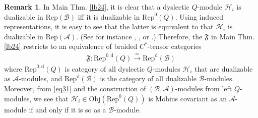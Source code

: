 \documentclass[11pt,b5paper,notitlepage]{article}
\theoremstyle{definition}
\newtheorem{rem}[df]{Remark}
\theoremstyle{plain}
\newcommand{\fk}{\mathfrak}
\newcommand{\mc}{\mathcal}
\newcommand{\Rep}{\mathrm{Rep}}
\newcommand{\RepA}{\mathrm{Rep}(\mathcal A)}
\newcommand{\Obj}{\mathrm{Obj}}
\numberwithin{equation}{section}
\begin{document}
\begin{rem}
In Main Thm. \ref{lb24}, it is clear that a dyslectic $Q$-module $\mc H_i$ is dualizable in $\Rep(\mc B)$ iff it is dualizable in $\Rep^0(Q)$. Using induced representations, it is easy to see that the latter is equivalent to that $\mc H_i$ is dualizable in $\RepA$. (See for instance \cite{KO02}, \cite{NY16}, or \cite[Thm. 3.18]{Gui19}.) Therefore, the $\fk F$ in Main Thm. \ref{lb24} restricts to an equivalence of braided $C^*$-tensor categories
\begin{align*}
\fk F:\Rep^{0,\mathrm d}(Q)\xrightarrow{\simeq}\Rep^{\mathrm d}(\mc B)
\end{align*}
where $\Rep^{0,\mathrm d}(Q)$ is category of all dyslectic $Q$-modules $\mc H_i$ that are dualizable as $\mc A$-modules, and  $\Rep^{\mathrm d}(\mc B)$ is the  category of all  dualizable $\mc B$-modules. Moreover, from \eqref{eq31} and the construction of $(\mc B,\mc A)$-modules from left $Q$-modules,  we see that $\mc H_i\in\Obj(\Rep^0(Q))$ is M\"obius covariant as an $\mc A$-module if and only if it is so as a $\mc B$-module. 
\end{rem}










	
	
	
	
	

	
\end{document}
